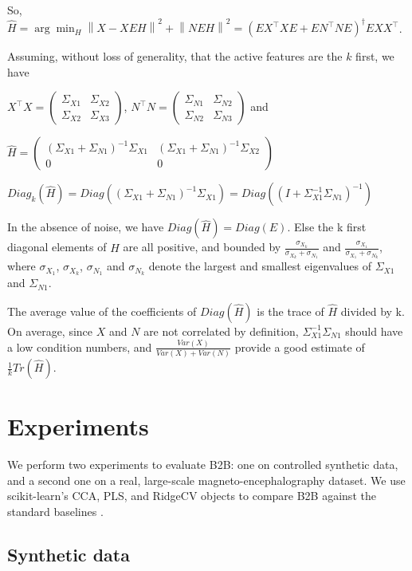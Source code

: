 \documentclass{article}
\begin{document}
So, $\hat H = \arg \min_H  \left \| X - XEH\right\| ^2  + \left \| NEH\right \| ^2 = (E X^\top XE +EN^\top NE) ^\dagger EXX^\top$.

Assuming, without loss of generality, that the active features are the $k$ first, we have

$X^\top X = \left(\begin{array}{lccl}\Sigma_{X1} & \Sigma_{X2} \\ \Sigma_{X2} & \Sigma_{X3}\end{array}\right)$, $N^\top N = \left(\begin{array}{lccl}\Sigma_{N1} & \Sigma_{N2} \\ \Sigma_{N2} & \Sigma_{N3}\end{array}\right)$ and

$\hat H = \left(\begin{array}{cc}(\Sigma_{X1}+\Sigma_{N1})^{-1}\Sigma_{X1} & (\Sigma_{X1}+\Sigma_{N1})^{-1}\Sigma_{X2} \\0 & 0\end{array}\right)$

$Diag_k (\hat H) = Diag((\Sigma_{X1}+\Sigma_{N1})^{-1}\Sigma_{X1}) = Diag((I+\Sigma_{X1}^{-1}\Sigma_{N1})^{-1})$

In the absence of noise, we have $Diag(\hat H) = Diag(E)$. Else the k first diagonal elements of $\hat H$ are all positive, and bounded by $\frac{\sigma_{X_k}}{\sigma_{X_k} +\sigma_{N_1}}$ and $\frac{\sigma_{X_1}}{\sigma_{X_1} +\sigma_{N_k}}$, where  $\sigma_{X_1}$, $\sigma_{X_k}$, $\sigma_{N_1}$ and $\sigma_{N_k}$ denote the largest and smallest eigenvalues of $\Sigma_{X1}$ and $\Sigma_{N1}$.

The average value of the coefficients of $Diag(\hat H)$ is the trace of $\hat H$ divided by k. On average, since $X$ and $N$ are not correlated by definition, $\Sigma_{X1}^{-1}\Sigma_{N1}$ should have a low condition numbers, and $\frac{Var(X)}{Var(X)+Var(N)}$ provide a good estimate of $\frac{1}{k}Tr(\hat H)$.

\section{Experiments}

We perform two experiments to evaluate B2B: one on controlled synthetic data, and a second one on a real, large-scale magneto-encephalography dataset.
%
We use scikit-learn's CCA, PLS, and RidgeCV objects to compare B2B against the standard baselines \citep{sklearn}.

\subsection{Synthetic data}
\label{sec:experiment_synthetic}
\end{document}
